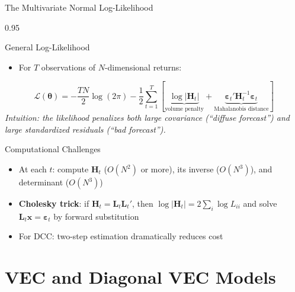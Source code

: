 \documentclass[9pt, aspectratio=169, t]{beamer}
\begin{document}
\begin{frame}{The Multivariate Normal Log-Likelihood}
    \begin{cminipage}{0.95\textwidth}
    {\footnotesize
    \begin{block}{General Log-Likelihood}
        \begin{itemize}\setlength{\itemsep}{0pt}
            \item For $T$ observations of $N$-dimensional returns:
        \end{itemize}
        \[
            \mathcal{L}(\boldsymbol{\theta}) = -\frac{TN}{2}\log(2\pi) - \frac{1}{2}\sum_{t=1}^T \left[ \underbrace{\log|\mathbf{H}_t|}_{\text{volume penalty}} + \underbrace{\boldsymbol{\varepsilon}_t'\mathbf{H}_t^{-1}\boldsymbol{\varepsilon}_t}_{\text{Mahalanobis distance}} \right]
        \]
        \textit{Intuition: the likelihood penalizes both large covariance (``diffuse forecast'') and large standardized residuals (``bad forecast'').}
    \end{block}
    \begin{block}{Computational Challenges}
        \begin{itemize}\setlength{\itemsep}{0pt}
            \item At each $t$: compute $\mathbf{H}_t$ ($O(N^2)$ or more), its inverse ($O(N^3)$), and determinant ($O(N^3)$)
            \item \textbf{Cholesky trick}: if $\mathbf{H}_t = \mathbf{L}_t\mathbf{L}_t'$, then $\log|\mathbf{H}_t| = 2\sum_{i}\log L_{ii}$ and solve $\mathbf{L}_t\mathbf{x} = \boldsymbol{\varepsilon}_t$ by forward substitution
            \item For DCC: two-step estimation dramatically reduces cost
        \end{itemize}
    \end{block}
    }
    \end{cminipage}
\end{frame}

\section{VEC and Diagonal VEC Models}
\end{document}

